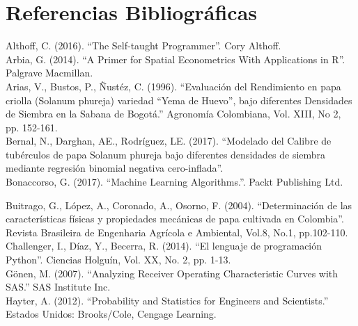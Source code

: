 
\chapter*{Referencias Bibliográficas}

\noindent
Althoff, C. (2016). "`The Self-taught Programmer"'. Cory Althoff.\\

\noindent
Arbia, G. (2014). "`A Primer for Spatial Econometrics With Applications in R"'. Palgrave Macmillan.\\

\noindent
Arias, V., Bustos, P., Ñustéz, C. (1996). "`Evaluación del Rendimiento en papa criolla (Solanum phureja) variedad "`Yema de Huevo"', bajo diferentes Densidades de Siembra en la Sabana de Bogotá."' Agronomía Colombiana, Vol. XIII, No 2, pp. 152-161.\\

\noindent
Bernal, N., Darghan, AE., Rodríguez, LE. (2017). "`Modelado del Calibre de tubérculos de papa Solanum phureja bajo diferentes densidades de siembra mediante regresión binomial negativa cero-inflada"'.\\

\noindent
Bonaccorso, G. (2017).  "`Machine Learning Algorithms."'. Packt Publishing Ltd.

\noindent
Buitrago, G., López, A., Coronado, A., Osorno, F. (2004). "`Determinación de las características físicas y propiedades mecánicas de papa cultivada en Colombia"'. Revista Brasileira de Engenharia Agrícola e Ambiental, Vol.8, No.1, pp.102-110.\\

\noindent
Challenger, I., Díaz, Y., Becerra, R. (2014). "`El lenguaje de programación Python"'. Ciencias Holguín, Vol. XX, No. 2, pp. 1-13.\\

\noindent
Gönen, M. (2007). "`Analyzing Receiver Operating Characteristic Curves with SAS."' SAS Institute Inc.\\

\noindent
Hayter, A. (2012). "`Probability and Statistics for Engineers and Scientists."' Estados Unidos: Brooks/Cole, Cengage Learning.\\

